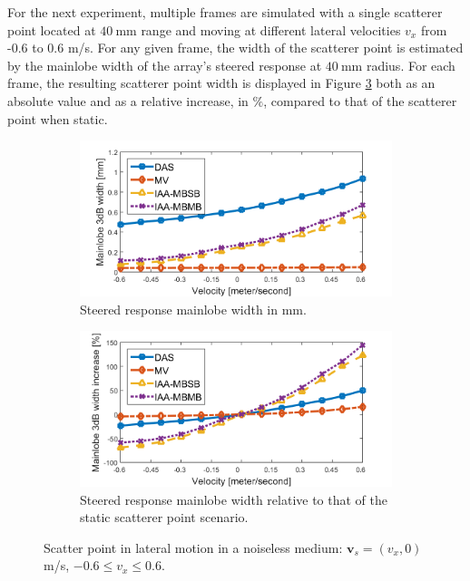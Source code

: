 For the next experiment, multiple frames are simulated with a single scatterer point located at $40~$mm range and moving at different lateral velocities $v_x$ from -0.6 to 0.6 m/s.
For any given frame, the width of the scatterer point is estimated by the mainlobe width of the array's steered response at $40~$mm radius. For each frame, the resulting scatterer point width is displayed in Figure \ref{fig:width_vs_velocity} both as an absolute value and as a relative increase, in $\%$, compared to that of the scatterer point when static.

\begin{figure}[ht]
    \centering
    \begin{subfigure}[t]{\linewidth}
        \includegraphics[width=\linewidth]{./images/results/2.1/mainlobe_width_65.png}
        \caption{Steered response mainlobe width in mm.}
        \label{fig:width_vs_velocity_a}
    \end{subfigure}
    \quad
    \begin{subfigure}[t]{\linewidth}
        \includegraphics[width=\linewidth]{./images/results/2.1/mainlobe_width_65_rel.png}
        \caption{Steered response mainlobe width relative to that of the static scatterer point scenario.}
        \label{fig:width_vs_velocity_b}
    \end{subfigure}
	\caption{Scatter point in lateral motion in a noiseless medium: $\boldsymbol{v}_s = (v_x, 0)~$m/s, $-0.6 \leq v_x \leq 0.6$.}
	\label{fig:width_vs_velocity}
\end{figure}

